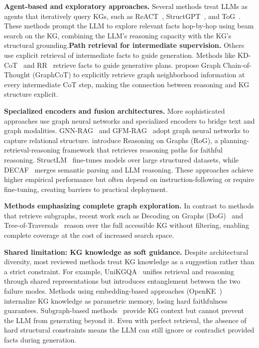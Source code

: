 \textbf{Agent-based and exploratory approaches.} Several methods treat LLMs as agents that iteratively query KGs, such as ReACT~\citep{yao2022react}, StructGPT~\citep{jiang2023structgpt}, and ToG~\citep{sun2024tog}. These methods prompt the LLM to explore relevant facts hop-by-hop using beam search on the KG, combining the LLM's reasoning capacity with the KG's structural grounding.\textbf{Path retrieval for intermediate supervision.} Others use explicit retrieval of intermediate facts to guide generation. Methods like KD-CoT~\citep{wang2023knowledgedrivencotexploringfaithful} and RR~\citep{he2022rethinking} retrieve facts to guide generative plans. \citet{jin2024graphcot} propose Graph Chain-of-Thought (GraphCoT) to explicitly retrieve graph neighborhood information at every intermediate CoT step, making the connection between reasoning and KG structure explicit.

\textbf{Specialized encoders and fusion architectures.} More sophisticated approaches use graph neural networks and specialized encoders to bridge text and graph modalities. GNN-RAG~\citep{mavromatis2024gnnrag} and GFM-RAG~\citep{luo2025gfmrag} adopt graph neural networks to capture relational structure. \citet{luo2024rog} introduce Reasoning on Graphs (RoG), a planning-retrieval-reasoning framework that retrieves reasoning paths for faithful reasoning. StructLM~\citep{zhuang2024structlm} fine-tunes models over large structured datasets, while DECAF~\citep{yu2023decaf} merges semantic parsing and LLM reasoning. These approaches achieve higher empirical performance but often depend on instruction-following or require fine-tuning, creating barriers to practical deployment.

\textbf{Methods emphasizing complete graph exploration.} In contrast to methods that retrieve subgraphs, recent work such as Decoding on Graphs (DoG)~\citep{li2024-decoding-on-graphs} and Tree-of-Traversals~\citep{markowitz-etal-2024-tree} reason over the full accessible KG without filtering, enabling complete coverage at the cost of increased search space.

\textbf{Shared limitation: KG knowledge as soft guidance.} Despite architectural diversity, most reviewed methods treat KG knowledge as a suggestion rather than a strict constraint. For example, UniKGQA~\citep{jiang2022unikgqa} unifies retrieval and reasoning through shared representations but introduces entanglement between the two failure modes. Methods using embedding-based approaches (OpenKE~\citep{sun2018openke}) internalize KG knowledge as parametric memory, losing hard faithfulness guarantees. Subgraph-based methods~\citep{zhang2022subgraph, wang2021kepler, sun2019pullnet, he2022rethinkingKG, mavromatis2022rearev} provide KG context but cannot prevent the LLM from generating beyond it. Even with perfect retrieval, the absence of hard structural constraints means the LLM can still ignore or contradict provided facts during generation.


